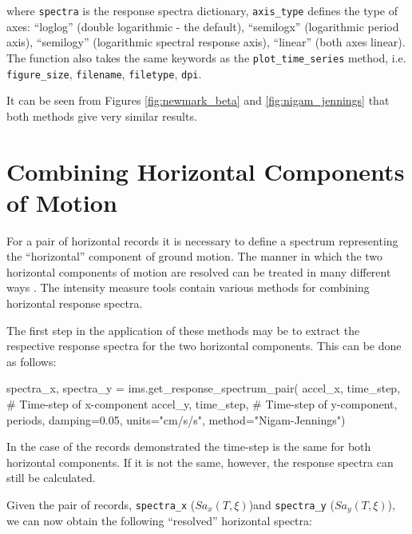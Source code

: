 \noindent where \verb=spectra= is the response spectra dictionary, \verb=axis_type= defines the type of axes: ``loglog'' (double logarithmic - the default), ``semilogx'' (logarithmic period axis), ``semilogy'' (logarithmic spectral response axis), ``linear'' (both axes linear). The function also takes the same keywords as the \verb=plot_time_series= method, i.e. \verb=figure_size=, \verb=filename=, \verb=filetype=, \verb=dpi=.

It can be seen from Figures  \ref{fig:newmark_beta} and \ref{fig:nigam_jennings} that both methods give very similar results.

\section{Combining Horizontal Components of Motion}
\label{sec:horizontal}

For a pair of horizontal records it is necessary to define a spectrum representing the ``horizontal'' component of ground motion. The manner in which the two horizontal components of motion are resolved can be treated in many different ways \parencite[e.g.][]{Douglas2003, BeyerBommer2006}. The intensity measure tools contain various methods for combining horizontal response spectra. 

The first step in the application of these methods may be to extract the respective response spectra for the two horizontal components. This can be done as follows:

\begin{python}[frame=single]
spectra_x, spectra_y = ims.get_response_spectrum_pair(
    accel_x,
    time_step, # Time-step of x-component
    accel_y,
    time_step, # Time-step of y-component,
    periods,
    damping=0.05,
    units="cm/s/s",
    method="Nigam-Jennings")
\end{python}

In the case of the records demonstrated the time-step is the same for both horizontal components. If it is not the same, however, the response spectra can still be calculated.

Given the pair of records, \verb=spectra_x= ($Sa_x \left( {T, \xi} \right)$)and \verb=spectra_y= ($Sa_y \left( {T, \xi} \right)$), we can now obtain the following ``resolved'' horizontal spectra:

